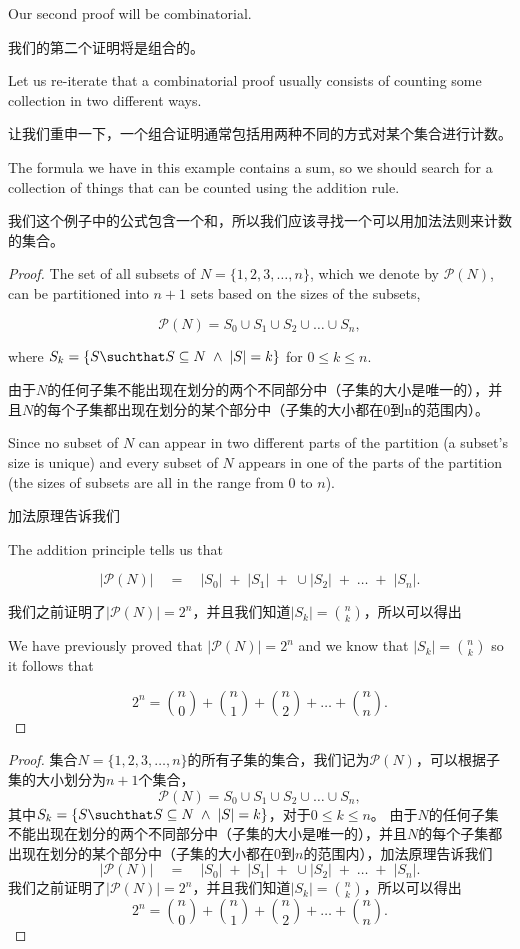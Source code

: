 Our second proof will be combinatorial.

我们的第二个证明将是组合的。

Let us re-iterate that a combinatorial proof usually consists of 
counting some collection in two different ways.

让我们重申一下，一个组合证明通常包括用两种不同的方式对某个集合进行计数。

The formula
we have in this example contains a sum, so we should search for 
a collection of things that can be counted using the addition
rule.

我们这个例子中的公式包含一个和，所以我们应该寻找一个可以用加法法则来计数的集合。

\begin{proof} 
The set of all subsets of $N = \{1, 2, 3, \ldots, n\}$, which we
denote by ${\mathcal P}(N)$, can be partitioned into $n+1$ sets based
on the sizes of the subsets,

\[ {\mathcal P}(N) = S_0 \cup S_1 \cup S_2 \cup \ldots \cup S_n, \]

\noindent where $S_k = \{ S \suchthat S \subseteq N \; \land \; |S| = k \}$
for $0 \leq k \leq n$.

由于$N$的任何子集不能出现在划分的两个不同部分中（子集的大小是唯一的），并且$N$的每个子集都出现在划分的某个部分中（子集的大小都在0到n的范围内）。

Since no subset of $N$ can appear in two different
parts of the partition (a subset's size is unique) and every subset of $N$
appears in one of the parts of the partition (the sizes of subsets are
all in the range from $0$ to $n$).

加法原理告诉我们

The addition principle tells us that

\[ |{\mathcal P}(N)| \quad = \quad |S_0| \;+\; |S_1| \;+\;\cup |S_2| \;+\; \ldots \;+\; |S_n|. \]

我们之前证明了$|{\mathcal P}(N)| = 2^n$，并且我们知道$|S_k| = \binom{n}{k}$，所以可以得出

We have previously proved that $ |{\mathcal P}(N)| = 2^n$ and we know that
$|S_k| = \binom{n}{k}$ so it follows that


\[ 2^n = \binom{n}{0} + \binom{n}{1} +\binom{n}{2} + \ldots + \binom{n}{n}. \] 

\end{proof}

\begin{proof}
集合$N = \{1, 2, 3, \ldots, n\}$的所有子集的集合，我们记为${\mathcal P}(N)$，可以根据子集的大小划分为$n+1$个集合，
\[ {\mathcal P}(N) = S_0 \cup S_1 \cup S_2 \cup \ldots \cup S_n, \]
\noindent 其中$S_k = \{ S \suchthat S \subseteq N \; \land \; |S| = k \}$，对于$0 \leq k \leq n$。
由于$N$的任何子集不能出现在划分的两个不同部分中（子集的大小是唯一的），并且$N$的每个子集都出现在划分的某个部分中（子集的大小都在0到$n$的范围内），加法原理告诉我们
\[ |{\mathcal P}(N)| \quad = \quad |S_0| \;+\; |S_1| \;+\;\cup |S_2| \;+\; \ldots \;+\; |S_n|. \]
我们之前证明了$|{\mathcal P}(N)| = 2^n$，并且我们知道$|S_k| = \binom{n}{k}$，所以可以得出
\[ 2^n = \binom{n}{0} + \binom{n}{1} +\binom{n}{2} + \ldots + \binom{n}{n}. \] 
\end{proof}

